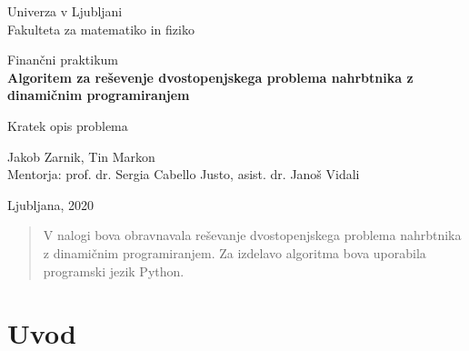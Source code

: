 \documentclass[a4paper, 11pt]{article}
\begin{document}
		\begin{titlepage}
			\begin{center}

			\large
			Univerza v Ljubljani\\
				\normalsize
				Fakulteta za matematiko in fiziko\\

			\vspace{5 cm} 

				\large
				Finančni praktikum\\


			\vspace{0.5cm}
			\LARGE
				\textbf{Algoritem za reševenje dvostopenjskega problema nahrbtnika z dinamičnim programiranjem}

			\vspace{0.5 cm}
				\large
				Kratek opis problema
			
			\vspace{2.0 cm}

			\large
				Jakob Zarnik, Tin Markon \\


			\vspace{1.0 cm}
			\normalsize
				Mentorja: prof. dr. Sergia Cabello Justo, asist. dr. Janoš Vidali
			\vspace{3cm}


			\vfill

				\large Ljubljana, 2020

			\end{center}
		\end{titlepage}


\newpage

\tableofcontents
\vspace{22mm}

\newpage
		
	\pagestyle{fancy}
	\fancyhead{}
	\fancyfoot{}
	\fancyfoot[R]{\thepage}
	
	\begin{abstract}
	
	V nalogi bova obravnavala reševanje dvostopenjskega problema nahrbtnika z dinamičnim programiranjem. Za izdelavo algoritma bova uporabila programski jezik Python.
	
	\end{abstract}
	
	\pagebreak
	
	\section{Uvod}
	
\end{document}
